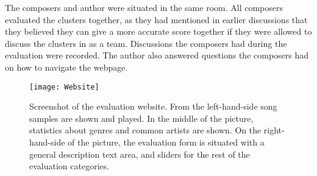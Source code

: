 \documentclass[../report.tex]{subfiles}
\begin{document}
The composers and author were situated in the same room. All composers evaluated the clusters together, as they had mentioned in earlier discussions that they believed they can give a more accurate score together if they were allowed to discuss the clusters in as a team. Discussions the composers had during the evaluation were recorded. The author also answered questions the composers had on how to navigate the webpage.

\begin{figure}[h!]
\begin{center}
  \texttt{[image: Website]}
    \caption{Screenshot of the evaluation website. \newline
      From the left-hand-side song samples are shown and played. In the middle of the picture, statistics about genres and common artists are shown. On the right-hand-side of the picture, the evaluation form is situated with a general description text area, and sliders for the rest of the evaluation categories.
  }\label{fig:website}
\end{center}
\end{figure}
\end{document}
